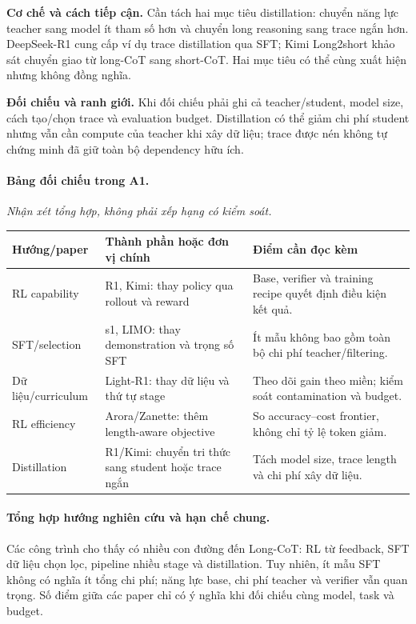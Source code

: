 \noindent\textbf{Cơ chế và cách tiếp cận.} Cần tách hai mục tiêu distillation: chuyển năng lực teacher sang model ít tham số hơn và chuyển long reasoning sang trace ngắn hơn. DeepSeek-R1 cung cấp ví dụ trace distillation qua SFT; Kimi Long2short khảo sát chuyển giao từ long-CoT sang short-CoT. Hai mục tiêu có thể cùng xuất hiện nhưng không đồng nghĩa.\par
\noindent\textbf{Đối chiếu và ranh giới.} Khi đối chiếu phải ghi cả teacher/student, model size, cách tạo/chọn trace và evaluation budget. Distillation có thể giảm chi phí student nhưng vẫn cần compute của teacher khi xây dữ liệu; trace được nén không tự chứng minh đã giữ toàn bộ dependency hữu ích.\par

\begin{samepage}
\paragraph{Bảng đối chiếu trong A1.}
\noindent\textit{Nhận xét tổng hợp, không phải xếp hạng có kiểm soát.}
\begin{center}\small
\begin{tabularx}{\textwidth}{>{\raggedright\arraybackslash}p{2.7cm}>{\raggedright\arraybackslash}X>{\raggedright\arraybackslash}X}
\toprule
\textbf{Hướng/paper} & \textbf{Thành phần hoặc đơn vị chính} & \textbf{Điểm cần đọc kèm} \\
\midrule
RL capability & R1, Kimi: thay policy qua rollout và reward & Base, verifier và training recipe quyết định điều kiện kết quả. \\
SFT/selection & s1, LIMO: thay demonstration và trọng số SFT & Ít mẫu không bao gồm toàn bộ chi phí teacher/filtering. \\
Dữ liệu/curriculum & Light-R1: thay dữ liệu và thứ tự stage & Theo dõi gain theo miền; kiểm soát contamination và budget. \\
RL efficiency & Arora/Zanette: thêm length-aware objective & So accuracy–cost frontier, không chỉ tỷ lệ token giảm. \\
Distillation & R1/Kimi: chuyển tri thức sang student hoặc trace ngắn & Tách model size, trace length và chi phí xây dữ liệu. \\
\bottomrule
\end{tabularx}
\end{center}
\end{samepage}
\paragraph{Tổng hợp hướng nghiên cứu và hạn chế chung.}
Các công trình cho thấy có nhiều con đường đến Long-CoT: RL từ feedback, SFT dữ liệu chọn lọc, pipeline nhiều stage và distillation. Tuy nhiên, ít mẫu SFT không có nghĩa ít tổng chi phí; năng lực base, chi phí teacher và verifier vẫn quan trọng. Số điểm giữa các paper chỉ có ý nghĩa khi đối chiếu cùng model, task và budget.

